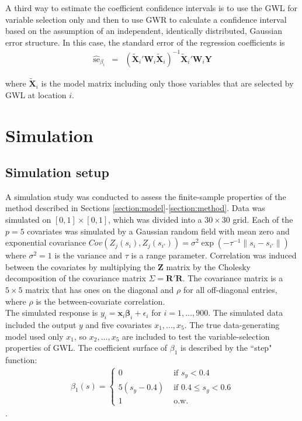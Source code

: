 \documentclass[authoryear, review, 11pt]{elsarticle}
\begin{document}
	 A third way to estimate the coefficient confidence intervals is to use the GWL for variable selection only and then to use GWR to calculate a confidence interval based on the assumption of an independent, identically distributed, Gaussian error structure. In this case, the standard error of the regression coefficients is 
	 \begin{eqnarray}
		\hat{\mbox{se}}_{\beta_i} &=& \left( \tilde{\bm{X}}_i'\bm{W}_i \tilde{\bm{X}}_i \right)^{-1}  \tilde{\bm{X}}_i'\bm{W}_i\bm{Y}
	\end{eqnarray}
	
	where $\tilde{\bm{X}}_i$ is the model matrix including only those variables that are selected by GWL at location $i$.


\section{Simulation}
	\subsection{Simulation setup}
	A simulation study was conducted to assess the finite-sample properties of the method described in Sections \ref{section:model}-\ref{section:method}. Data was simulated on $[0,1] \times [0,1]$, which was divided into a $30 \times 30$ grid. Each of the $p=5$ covariates was simulated by a Gaussian random field with mean zero and exponential covariance $Cov \left(Z_j(s_i), Z_j(s_{i'}) \right) = \sigma^2 \exp{\left( -\tau^{-1} \|s_i - s_{i'} \| \right)}$ where $\sigma^2=1$ is the variance and $\tau$ is a range parameter. Correlation was induced between the covariates by multiplying the $\bm{Z}$ matrix by the Cholesky decomposition of the covariance matrix $\Sigma = \bm{R}'\bm{R}$. The covariance matrix is a $5 \times 5$ matrix that has ones on the diagonal and $\rho$ for all off-diagonal entries, where $\rho$ is the between-covariate correlation.\\
		
	The simulated response is $y_i = \bm{x}_i \bm{\beta}_i + \epsilon_i$ for $i=1, \dots, 900$. The simulated data included the output $y$ and five covariates $x_1, \dots, x_5$. The true data-generating model used only $x_1$, so $x_2, \dots, x_5$ are included to test the variable-selection properties of GWL. The coefficient surface of $\beta_1$ is described by the ``step" function:
	\begin{eqnarray}
		\beta_1(s) = \begin{cases} 0 &\mbox{ if } s_y<0.4 \\ 5(s_y-0.4) &\mbox{ if } 0.4 \leq s_y<0.6 \\ 1 &\mbox{ o.w.} \end{cases}
	\end{eqnarray}.\\
		
\end{document}
